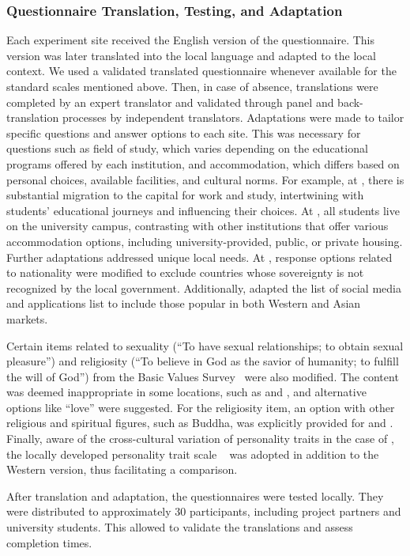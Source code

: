 \subsubsection{Questionnaire Translation, Testing, and Adaptation}
Each experiment site received the English version of the questionnaire. This version was later translated into the local language and adapted to the local context. We used a validated translated questionnaire whenever available for the standard scales mentioned above. Then, in case of absence, translations were completed by an expert translator and validated through panel and back-translation processes \cite{cha2007translation} by independent translators.
%
Adaptations were made to tailor specific questions and answer options to each site. This was necessary for questions such as field of study, which varies depending on the educational programs offered by each institution, and accommodation, which differs based on personal choices, available facilities, and cultural norms. For example, at \NUM, there is substantial migration to the capital for work and study, intertwining with students' educational journeys and influencing their choices. At \JLU, all students live on the university campus, contrasting with other institutions that offer various accommodation options, including university-provided, public, or private housing. Further adaptations addressed unique local needs. At \JLU, response options related to nationality were modified to exclude countries whose sovereignty is not recognized by the local government. Additionally, \JLU adapted the list of social media and applications list to include those popular in both Western and Asian markets.

Certain items related to sexuality (“To have sexual relationships; to obtain sexual pleasure”) and religiosity (“To believe in God as the savior of humanity; to fulfill the will of God”) from the Basic Values Survey~\cite{gouveia2014functional} were also modified. The content was deemed inappropriate in some locations, such as \AMRITA and \UC, and alternative options like “love” were suggested. For the religiosity item, an option with other religious and spiritual figures, such as Buddha, was explicitly provided for \AMRITA and \JLU. Finally, aware of the cross-cultural variation of personality traits in the case of \JLU, the locally developed personality trait scale ~\cite{zhang2019development} was adopted in addition to the Western version, thus facilitating a comparison.

\noindent
After translation and adaptation, the questionnaires were tested locally. They were distributed to approximately 30 participants, including project partners and university students. This allowed to validate the translations and assess completion times.



